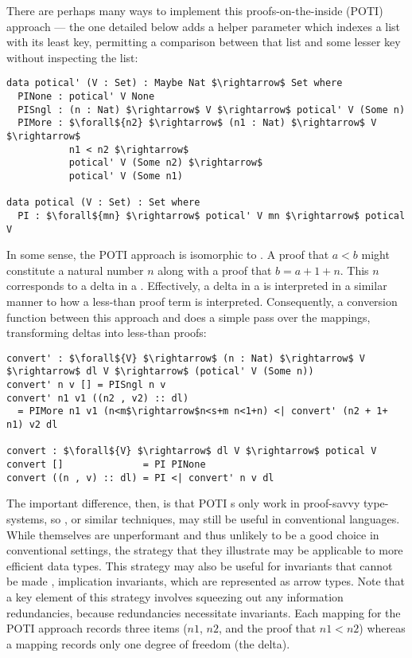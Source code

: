 There are perhaps many ways to implement this proofs-on-the-inside (POTI) \cal{} approach --- the one detailed below adds a helper parameter which indexes a list with its least key,
%
permitting a comparison between that list and some lesser key without inspecting the list:
%
\begin{lstlisting}
data potical' (V : Set) : Maybe Nat $\rightarrow$ Set where
  PINone : potical' V None
  PISngl : (n : Nat) $\rightarrow$ V $\rightarrow$ potical' V (Some n)
  PIMore : $\forall${n2} $\rightarrow$ (n1 : Nat) $\rightarrow$ V $\rightarrow$
           n1 < n2 $\rightarrow$
           potical' V (Some n2) $\rightarrow$
           potical' V (Some n1)

data potical (V : Set) : Set where
  PI : $\forall${mn} $\rightarrow$ potical' V mn $\rightarrow$ potical V
\end{lstlisting}

In some sense, the POTI \cal{} approach is isomorphic to \dds.
%
A proof that $a < b$ might constitute a natural number $n$ along with a proof that $b = a + 1 + n$.
%
This $n$ corresponds to a delta in a \dd.
%
Effectively, a delta in a \dd{} is interpreted in a similar manner to how a less-than proof term is interpreted.
%
Consequently, a conversion function between this approach and \dds{} does a simple pass over the mappings, transforming deltas into less-than proofs:
%
\begin{lstlisting}
convert' : $\forall${V} $\rightarrow$ (n : Nat) $\rightarrow$ V $\rightarrow$ dl V $\rightarrow$ (potical' V (Some n))
convert' n v [] = PISngl n v
convert' n1 v1 ((n2 , v2) :: dl)
  = PIMore n1 v1 (n<m$\rightarrow$n<s+m n<1+n) <| convert' (n2 + 1+ n1) v2 dl

convert : $\forall${V} $\rightarrow$ dl V $\rightarrow$ potical V
convert []              = PI PINone
convert ((n , v) :: dl) = PI <| convert' n v dl
\end{lstlisting}

The important difference, then, is that POTI \cal{}s only work in proof-savvy type-systems, so \dds{}, or similar techniques, may still be useful in conventional languages.
%
While \dds{} themselves are unperformant and thus unlikely to be a good choice in conventional settings,
%
the strategy that they illustrate may be applicable to more efficient data types.
%
This strategy may also be useful for invariants that cannot be made \prop, \eg{} implication invariants, which are represented as arrow types.
%
Note that a key element of this strategy involves squeezing out any information redundancies, because redundancies necessitate invariants.
%
Each mapping for the POTI \cal{} approach records three items ($n1$, $n2$, and the proof that $n1 < n2$) whereas a \dd{} mapping records only one degree of freedom (the delta).

